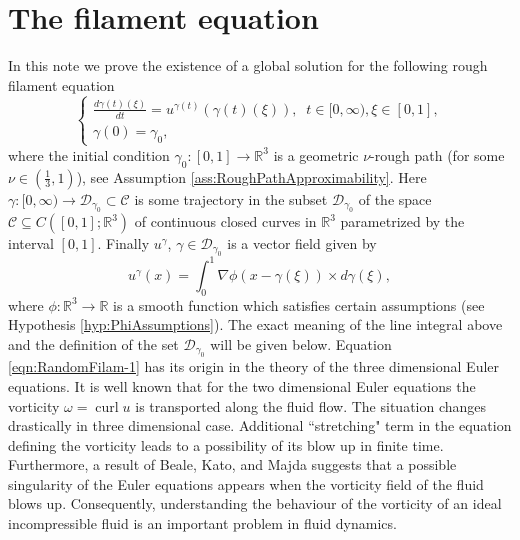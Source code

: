\documentclass[11pt,a4paper,reqno]{amsart}%
\theoremstyle{plain}
\theoremstyle{remark}
\theoremstyle{plain}
\numberwithin{equation}{section}
\newcommand\curl{\operatorname{curl}}
\def\Rnu{{\mathbb R}}
\begin{document}
\section{The filament equation}
In this note we prove the existence of a global solution for the following rough
 filament equation
\begin{equation}\label{eqn:RandomFilam-1}
\begin{cases}
\frac{d\gamma(t)(\xi)}{dt} = u^{\gamma(t)}(\gamma(t)(\xi)), \;\; t\in [0,\infty),\xi\in[0,1], \\
\gamma(0) = \gamma_0,
\end{cases}
\end{equation}
where the initial condition $\gamma_0:[0,1]\to\mathbb{R}^3$ is a  geometric $\nu$-rough path (for some  $\nu\in(\frac{1}{3},1)$),  see Assumption \ref{ass:RoughPathApproximability}. Here $\gamma:[0,\infty)\to \mathcal{D}_{\gamma_0}\subset \mathcal{C}$ is some trajectory in
the subset $\mathcal{D}_{\gamma_0}$ of the space $\mathcal{C}\subseteq C([0,1];\Rnu^3)$ of continuous closed curves in
$\Rnu^3$ parametrized by the interval $[0,1]$. Finally $u^\gamma$, $\gamma\in \mathcal{D}_{\gamma_0}$ is a vector field
given by
\begin{equation}
\label{eqn:RandomFilam-3}
u^\gamma(x)=\int_0^1\nabla\phi(x-\gamma(\xi))\times d\gamma(\xi),
\end{equation}
where $\phi:\Rnu^3\to\Rnu$ is a smooth function which satisfies
certain assumptions (see Hypothesis \ref{hyp:PhiAssumptions}).
The exact meaning of the line integral above and the definition of the set $\mathcal{D}_{\gamma_0}$ will be given below. Equation \eqref{eqn:RandomFilam-1} has its origin in
the theory of the three dimensional Euler equations.
It is well known that for the two dimensional Euler equations the vorticity ${\omega}=\curl {u}$ is transported along the fluid flow.
The situation changes drastically in three dimensional case. Additional ``stretching" term in the equation defining the vorticity
leads to a possibility of its blow up in finite time.
Furthermore, a result of Beale,
Kato, and Majda \cite{[BKM-1984]} suggests that a possible
singularity of the Euler equations appears when the vorticity field of the
fluid blows up. Consequently, understanding the behaviour of the vorticity of an ideal incompressible fluid is an  important problem in fluid dynamics.
\end{document}
